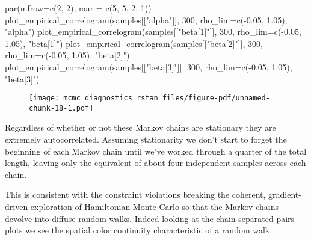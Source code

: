 \documentclass[
  letterpaper,
  DIV=11,
  numbers=noendperiod]{scrartcl}
\newenvironment{Shaded}{\begin{snugshade}}{\end{snugshade}}
\newcommand{\AttributeTok}[1]{\textcolor[rgb]{0.40,0.45,0.13}{#1}}
\newcommand{\DecValTok}[1]{\textcolor[rgb]{0.68,0.00,0.00}{#1}}
\newcommand{\FloatTok}[1]{\textcolor[rgb]{0.68,0.00,0.00}{#1}}
\newcommand{\FunctionTok}[1]{\textcolor[rgb]{0.28,0.35,0.67}{#1}}
\newcommand{\NormalTok}[1]{\textcolor[rgb]{0.00,0.23,0.31}{#1}}
\newcommand{\SpecialCharTok}[1]{\textcolor[rgb]{0.37,0.37,0.37}{#1}}
\newcommand{\StringTok}[1]{\textcolor[rgb]{0.13,0.47,0.30}{#1}}
\begin{document}
\begin{Shaded}
\begin{Highlighting}[]
\FunctionTok{par}\NormalTok{(}\AttributeTok{mfrow=}\FunctionTok{c}\NormalTok{(}\DecValTok{2}\NormalTok{, }\DecValTok{2}\NormalTok{), }\AttributeTok{mar =} \FunctionTok{c}\NormalTok{(}\DecValTok{5}\NormalTok{, }\DecValTok{5}\NormalTok{, }\DecValTok{2}\NormalTok{, }\DecValTok{1}\NormalTok{))}
\FunctionTok{plot\_empirical\_correlogram}\NormalTok{(samples[[}\StringTok{"alpha"}\NormalTok{]], }\DecValTok{300}\NormalTok{,}
                           \AttributeTok{rho\_lim=}\FunctionTok{c}\NormalTok{(}\SpecialCharTok{{-}}\FloatTok{0.05}\NormalTok{, }\FloatTok{1.05}\NormalTok{), }\StringTok{"alpha"}\NormalTok{)}
\FunctionTok{plot\_empirical\_correlogram}\NormalTok{(samples[[}\StringTok{"beta[1]"}\NormalTok{]], }\DecValTok{300}\NormalTok{,}
                           \AttributeTok{rho\_lim=}\FunctionTok{c}\NormalTok{(}\SpecialCharTok{{-}}\FloatTok{0.05}\NormalTok{, }\FloatTok{1.05}\NormalTok{), }\StringTok{"beta[1]"}\NormalTok{)}
\FunctionTok{plot\_empirical\_correlogram}\NormalTok{(samples[[}\StringTok{"beta[2]"}\NormalTok{]], }\DecValTok{300}\NormalTok{,}
                           \AttributeTok{rho\_lim=}\FunctionTok{c}\NormalTok{(}\SpecialCharTok{{-}}\FloatTok{0.05}\NormalTok{, }\FloatTok{1.05}\NormalTok{), }\StringTok{"beta[2]"}\NormalTok{)}
\FunctionTok{plot\_empirical\_correlogram}\NormalTok{(samples[[}\StringTok{"beta[3]"}\NormalTok{]], }\DecValTok{300}\NormalTok{,}
                           \AttributeTok{rho\_lim=}\FunctionTok{c}\NormalTok{(}\SpecialCharTok{{-}}\FloatTok{0.05}\NormalTok{, }\FloatTok{1.05}\NormalTok{), }\StringTok{"beta[3]"}\NormalTok{)}
\end{Highlighting}
\end{Shaded}

\begin{figure}[H]

{\centering \texttt{[image: mcmc\_diagnostics\_rstan\_files/figure-pdf/unnamed-chunk-18-1.pdf]}

}

\end{figure}

Regardless of whether or not these Markov chains are stationary they are
extremely autocorrelated. Assuming stationarity we don't start to forget
the beginning of each Markov chain until we've worked through a quarter
of the total length, leaving only the equivalent of about four
independent samples across each chain.

This is consistent with the constraint violations breaking the coherent,
gradient-driven exploration of Hamiltonian Monte Carlo so that the
Markov chains devolve into diffuse random walks. Indeed looking at the
chain-separated pairs plots we see the spatial color continuity
characteristic of a random walk.
\end{document}
